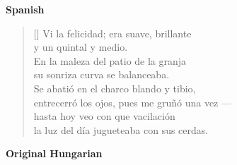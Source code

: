 \documentclass[a4paper,12pt,twoside,final]{book}
\begin{document}
\bigskip

\noindent \textbf{Spanish}


\settowidth{\versewidth}{entrecerró los ojos, pues me gruñó una vez ---}

\begin{verse}[\versewidth]
  Vi la felicidad; era suave, brillante \\
  y un quintal y medio. \\
  En la maleza del patio de la granja \\
  su sonriza curva se balanceaba. \\
  Se abatió en el charco blando y tibio, \\
  entrecerró los ojos, pues me gruñó una vez --- \\
  hasta hoy veo con que vacilación \\
  la luz del día jugueteaba con sus cerdas. \\
\end{verse}

\newpage


\noindent \textbf{Original Hungarian}



\settowidth{\versewidth}{hunyorgott, röffent még felém ---}
\end{document}
